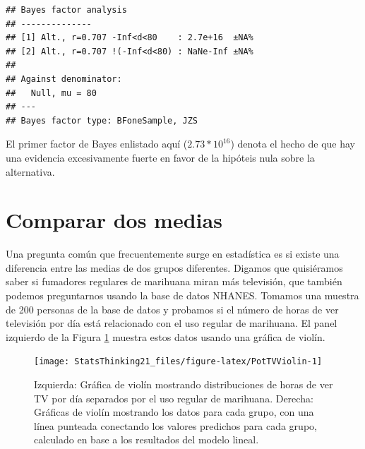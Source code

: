 \documentclass[
  12pt,
]{book}
\newenvironment{Shaded}{\begin{snugshade}}{\end{snugshade}}
\newcommand{\AttributeTok}[1]{\textcolor[rgb]{0.77,0.63,0.00}{#1}}
\newcommand{\ConstantTok}[1]{\textcolor[rgb]{0.00,0.00,0.00}{#1}}
\newcommand{\DecValTok}[1]{\textcolor[rgb]{0.00,0.00,0.81}{#1}}
\newcommand{\FunctionTok}[1]{\textcolor[rgb]{0.00,0.00,0.00}{#1}}
\newcommand{\NormalTok}[1]{#1}
\newcommand{\SpecialCharTok}[1]{\textcolor[rgb]{0.00,0.00,0.00}{#1}}
\begin{document}
\begin{Shaded}
\end{Shaded}

\begin{verbatim}
## Bayes factor analysis
## --------------
## [1] Alt., r=0.707 -Inf<d<80    : 2.7e+16  ±NA%
## [2] Alt., r=0.707 !(-Inf<d<80) : NaNe-Inf ±NA%
## 
## Against denominator:
##   Null, mu = 80 
## ---
## Bayes factor type: BFoneSample, JZS
\end{verbatim}

El primer factor de Bayes enlistado aquí (\(2.73 * 10^{16}\)) denota el hecho de que hay una evidencia excesivamente fuerte en favor de la hipóteis nula sobre la alternativa.

\hypertarget{comparing-two-means}{%
\section{Comparar dos medias}\label{comparing-two-means}}

Una pregunta común que frecuentemente surge en estadística es si existe una diferencia entre las medias de dos grupos diferentes. Digamos que quisiéramos saber si fumadores regulares de marihuana miran más televisión, que también podemos preguntarnos usando la base de datos NHANES. Tomamos una muestra de 200 personas de la base de datos y probamos si el número de horas de ver televisión por día está relacionado con el uso regular de marihuana. El panel izquierdo de la Figura \ref{fig:PotTVViolin} muestra estos datos usando una gráfica de violín.

\begin{figure}
\texttt{[image: StatsThinking21\_files/figure-latex/PotTVViolin-1]} \caption{Izquierda: Gráfica de violín mostrando distribuciones de horas de ver TV por día separados por el uso regular de marihuana. Derecha: Gráficas de violín mostrando los datos para cada grupo, con una línea punteada conectando los valores predichos para cada grupo, calculado en base a los resultados del modelo lineal.}\label{fig:PotTVViolin}
\end{figure}
\end{document}
